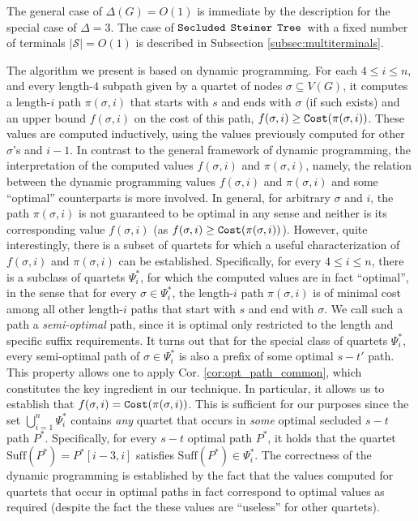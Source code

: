 \documentclass[12pt]{article}
\def\Cost{\mbox{\tt Cost}}
\newcommand{\MAXDEG}[0]{\Delta}
\newcommand{\PS}[0]{$\mbox{\tt Secluded}$ $\mbox{\tt Steiner}$
$\mbox{\tt Tree}$}
\newcommand{\Terminals}[0]{\mathcal{S}}
\newcommand{\DegThreeConst}[0]{4}
\newcommand{\Suff}[0]{\mathrm{Suff}}
\def\Cost{\mbox{\tt Cost}}
\begin{document}
The general case of $\MAXDEG(G)=O(1)$ is immediate by the description for the special case of $\MAXDEG=3$. The case of \PS\ with a fixed number of terminals $|\Terminals|=O(1)$ is described in Subsection \ref{subsec:multiterminals}. 
\par The algorithm we present is based on dynamic programming.
For each $\DegThreeConst \leq i \leq n$, and every length-$\DegThreeConst$ subpath given by a quartet of nodes $\sigma \subseteq V(G)$, it computes a length-$i$ path $\pi(\sigma,i)$ that  starts with $s$ and ends with $\sigma$ (if such exists) and an upper bound $f(\sigma,i)$ on the cost of this path, $f(\sigma,i) \geq \Cost(\pi(\sigma,i))$. These values are computed inductively, using the values previously computed for other $\sigma$'s and $i-1$. In contrast to the general framework of dynamic programming, the interpretation of the computed values $f(\sigma,i)$ and $\pi(\sigma,i)$, namely, the relation between the dynamic programming values $f(\sigma,i)$ and $\pi(\sigma,i)$ and some ``optimal'' counterparts  is more involved. In general, for arbitrary $\sigma$ and $i$, the path $\pi(\sigma,i)$ is not guaranteed to be optimal in any sense and neither is its corresponding value $f(\sigma,i)$ (as $f(\sigma,i) \geq \Cost(\pi(\sigma,i))$).
However, quite interestingly, there is a subset of quartets for which a useful characterization of $f(\sigma,i)$ and $\pi(\sigma,i)$ can be established. Specifically, for every $\DegThreeConst \leq i \leq n$, there is a subclass of quartets $\Psi^{*}_{i}$, for which the computed values are in fact ``optimal'', in the sense that for every $\sigma \in \Psi^{*}_{i}$, the length-$i$ path $\pi(\sigma,i)$ is of minimal cost among all other length-$i$ paths that start with $s$ and end with $\sigma$. We call such a path a \emph{semi-optimal} path, since it is optimal only restricted to the length and specific suffix requirements. It turns out that for the special class of quartets $\Psi^{*}_{i}$, every semi-optimal path of $\sigma \in \Psi^{*}_{i}$ is also a prefix of some optimal $s-t'$ path. This property allows one to apply Cor. \ref{cor:opt_path_common}, which constitutes the key ingredient in our technique. In particular, it allows us to establish that $f(\sigma,i)=\Cost(\pi(\sigma,i))$. This is sufficient for our purposes since the set $\bigcup_{i=1}^{n} \Psi^{*}_{i}$ contains \emph{any} quartet that occurs in \emph{some} optimal secluded $s-t$ path $P^{*}$. Specifically, for every $s-t$ optimal path $P^{*}$, it holds that the quartet $\Suff(P^{*})=P^{*}[i-3,i]$ satisfies $\Suff(P^{*}) \in \Psi^{*}_{i}$. The correctness of the dynamic programming is established by the fact that the values computed for quartets that occur in optimal paths in fact correspond to optimal values as required (despite the fact the these values are ``useless'' for other quartets).
\end{document}
